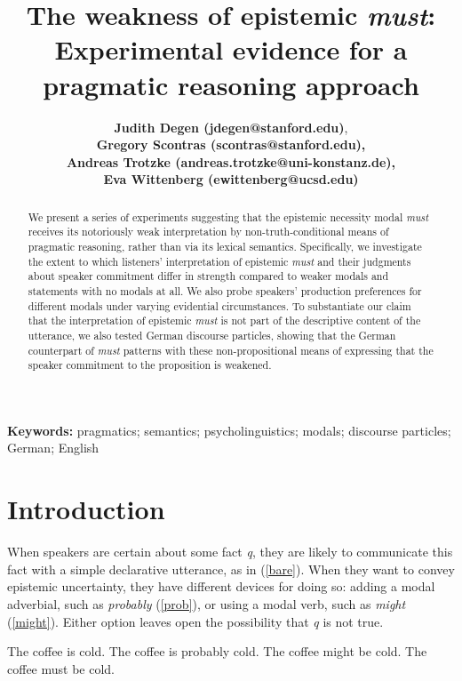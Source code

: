 \documentclass[11pt]{article}
\title{The weakness of epistemic \emph{must}: Experimental evidence for a pragmatic reasoning approach}
\author{{\large \bf Judith Degen (jdegen@stanford.edu)}, \\ {\large \bf Gregory Scontras (scontras@stanford.edu),}\\ {\large \bf Andreas Trotzke (andreas.trotzke@uni-konstanz.de),}\\ {\large \bf Eva Wittenberg (ewittenberg@ucsd.edu)}}
\begin{document}
\maketitle

\begin{abstract}

We present a series of experiments suggesting that the epistemic necessity modal \emph{must} receives its notoriously weak interpretation by non-truth-conditional means of pragmatic reasoning, rather than via its lexical semantics. Specifically, we investigate the extent to which listeners' interpretation of epistemic \emph{must} and their judgments about speaker commitment differ in strength compared to weaker modals and statements with no modals at all. We also probe speakers' production preferences for different modals under varying evidential circumstances. To substantiate our claim that the interpretation of epistemic \emph{must} is not part of the descriptive content of the utterance, we also tested German discourse particles, showing that the German counterpart of \emph{must} patterns with these non-propositional means of expressing that the speaker commitment to the proposition is weakened.	
\end{abstract}

\textbf{Keywords:} 
pragmatics; semantics; psycholinguistics; modals; discourse particles; German; English


\section{Introduction}

When speakers are certain about some fact \emph{q}, they are likely to communicate this fact with a simple declarative utterance, as in (\ref{bare}). When they want to convey epistemic uncertainty, they have different devices for doing so: adding a modal adverbial, such as \emph{probably} (\ref{prob}), or using a modal verb, such as \emph{might} (\ref{might}). Either option leaves open the possibility that \emph{q} is not true.

\begin{exe}
	\ex\label{english} \begin{xlist}
		\ex\label{bare} The coffee is cold.
		\ex\label{prob} The coffee is probably cold.
		\ex\label{might} The coffee might be cold.
		\ex\label{must} The coffee must be cold.
	\end{xlist}
\end{exe}
\end{document}
